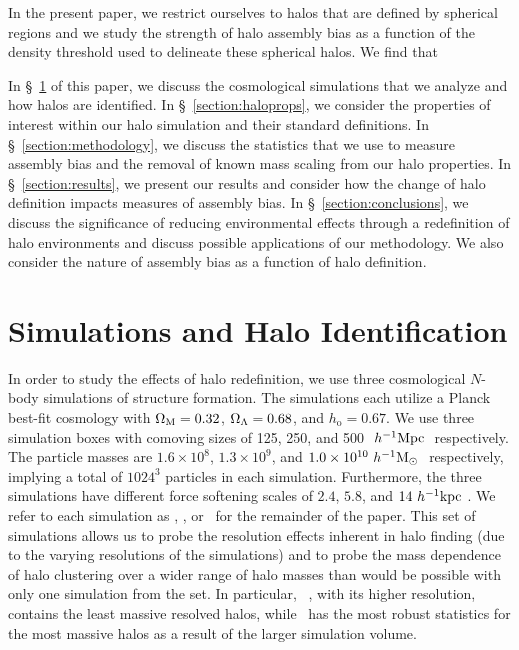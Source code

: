 \documentclass[usenatbib,usegraphicx,letterpaper]{mn2e}
\begin{document}
In the present paper, we restrict ourselves to halos that are defined by spherical regions and we 
study the strength of halo assembly bias as a function of the density threshold used to delineate these 
spherical halos. We find that 

 
In \S~\ref{section:data} of this paper, we discuss the cosmological simulations that we analyze and how halos are
identified. In \S~\ref{section:haloprops}, we consider the properties of interest within our halo simulation and
their standard definitions. In \S~\ref{section:methodology}, we discuss the statistics that we use to measure
assembly bias and the removal of known mass scaling from our halo properties. In \S~\ref{section:results}, we
present our results and consider how the change of halo definition impacts measures of assembly bias. In
\S~\ref{section:conclusions}, we discuss the significance of reducing environmental effects through a
redefinition of halo environments and discuss possible applications of our methodology. We also consider the
nature of assembly bias as a function of halo definition.





\section[]{Simulations and Halo Identification}
\label{section:data}

In order to study the effects of halo redefinition, we use three cosmological $N$-body simulations of structure
formation. The \citet{diemer15} simulations each utilize a Planck best-fit cosmology with $\Omega_{\mathrm{M}} = 0.32$, $\Omega_{\Lambda} =
0.68$, and $h_{\mathrm{o}} = 0.67$. We use three simulation boxes with comoving sizes of 125, 250, and 500
$\ h^{-1}\mathrm{Mpc}~$ respectively. The particle masses are $1.6 \times 10^8$, $1.3 \times 10^9$, and $1.0 \times 10^{10}
\ h^{-1}\mathrm{M}_{\odot}~$ respectively, implying a total of $1024^3$ particles in each simulation. Furthermore, the three
simulations have different force softening scales of $2.4$, $5.8$, and $14 \ h^{-1}\mathrm{kpc}~$. We refer to each simulation as
\simA, \simB, or \simC  \ for the remainder of the paper. This set of simulations allows us to probe the
resolution effects inherent in halo finding (due to the varying resolutions of the simulations) and to probe the
mass dependence of halo clustering over a wider range of halo masses than would be possible with only one
simulation from the set. In particular, \simA~, with its higher resolution, contains the least massive resolved
halos, while \simC~has the most robust statistics for the most massive halos as a result of the larger simulation
volume.
\end{document}
